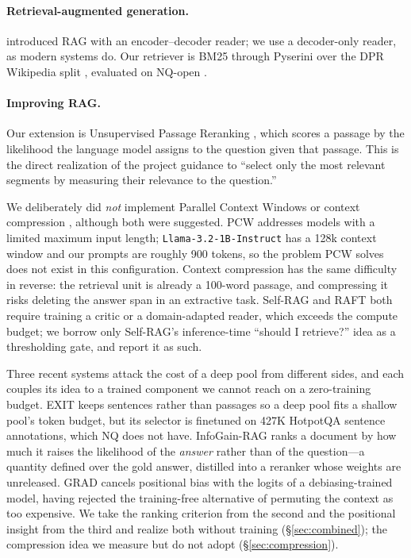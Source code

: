 \documentclass[11pt]{article}
\begin{document}
\paragraph{Retrieval-augmented generation.} \citet{lewis2020rag} introduced RAG with an
encoder--decoder reader; we use a decoder-only reader, as modern systems do. Our retriever is
BM25 through Pyserini \citep{lin2021pyserini} over the DPR Wikipedia split
\citep{karpukhin2020dpr}, evaluated on NQ-open \citep{kwiatkowski2019nq}.

\paragraph{Improving RAG.} Our extension is Unsupervised Passage Reranking
\citep{sachan2022upr}, which scores a passage by the likelihood the language model assigns to
the question given that passage. This is the direct realization of the project guidance to
``select only the most relevant segments by measuring their relevance to the question.''

We deliberately did \emph{not} implement Parallel Context Windows \citep{ratner2023pcw} or
context compression \citep{hou2024compression}, although both were suggested. PCW addresses
models with a limited maximum input length; \texttt{Llama-3.2-1B-Instruct} has a 128k context
window and our prompts are roughly 900 tokens, so the problem PCW solves does not exist in
this configuration. Context compression has the same difficulty in reverse: the retrieval unit
is already a 100-word passage, and compressing it risks deleting the answer span in an
extractive task. Self-RAG \citep{asai2024selfrag} and RAFT \citep{zhang2024raft} both require
training a critic or a domain-adapted reader, which exceeds the compute budget; we borrow only
Self-RAG's inference-time ``should I retrieve?'' idea as a thresholding gate, and report it as
such.

Three recent systems attack the cost of a deep pool from different sides, and each couples its
idea to a trained component we cannot reach on a zero-training budget. EXIT
\citep{hwang2025exit} keeps sentences rather than passages so a deep pool fits a shallow
pool's token budget, but its selector is finetuned on 427K HotpotQA sentence annotations,
which NQ does not have. InfoGain-RAG \citep{wang2025infogain} ranks a document by how much it
raises the likelihood of the \emph{answer} rather than of the question---a quantity defined
over the gold answer, distilled into a reranker whose weights are unreleased. GRAD
\citep{lee2026grad} cancels positional bias with the logits of a debiasing-trained model, having
rejected the training-free alternative of permuting the context as too expensive. We take the
ranking criterion from the second and the positional insight from the third and realize both
without training (\S\ref{sec:combined}); the compression idea we measure but do not adopt
(\S\ref{sec:compression}).
\end{document}
